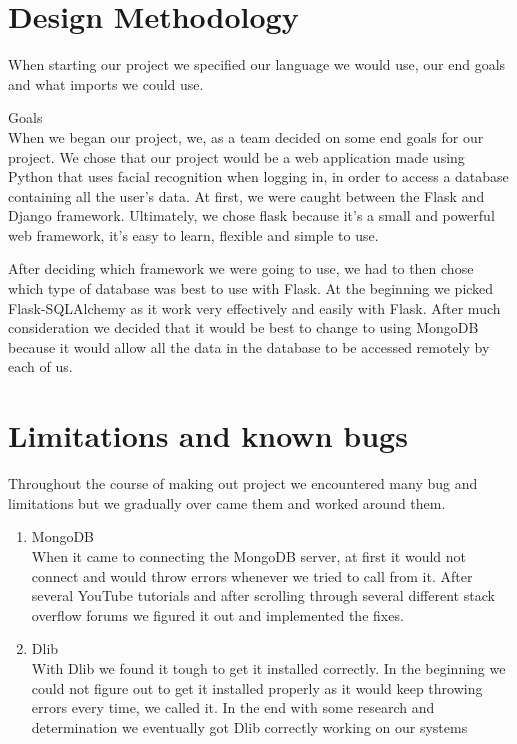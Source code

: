 \documentclass{article}
\begin{document}
\section{Design Methodology}
When starting our project we specified our language we would use, our end goals  and what imports we could use.

\item	Goals \\
When we began our project, we, as a team decided on some end goals for our project.  We chose that our project would be a web application made using Python that uses facial recognition when logging in, in order to access a database containing all the user’s data.
At first, we were caught between the Flask and Django framework. Ultimately, we chose flask because it’s a small and powerful web framework, it’s easy to learn, flexible and simple to use.\medskip

After deciding which framework we were going to use, we had to then chose which type of database was best to use with Flask. At the beginning we picked Flask-SQLAlchemy as it work very effectively and easily with Flask. After much consideration we decided that it would be best to change to using MongoDB because it would allow all the data in the database to be accessed remotely by each of us.

\section{Limitations and known bugs}
Throughout the course of making out project we encountered many bug and limitations but we gradually over came them and worked around them.
\begin{enumerate}
\item MongoDB \\
When it came to connecting the MongoDB server, at first it would not connect and would throw errors whenever we tried to call from it. After several YouTube tutorials and after scrolling through several different stack overflow forums we figured it out and implemented the fixes. 
\item Dlib \\
With Dlib we found it tough to get it installed correctly. In the beginning we could not figure out to get it installed properly as it would keep throwing errors every time, we called it. In the end with some research and determination we eventually got Dlib correctly working on our systems
\\
\\
\\
\\
\\
\\
\\
\\

\end{enumerate}
\end{document}
